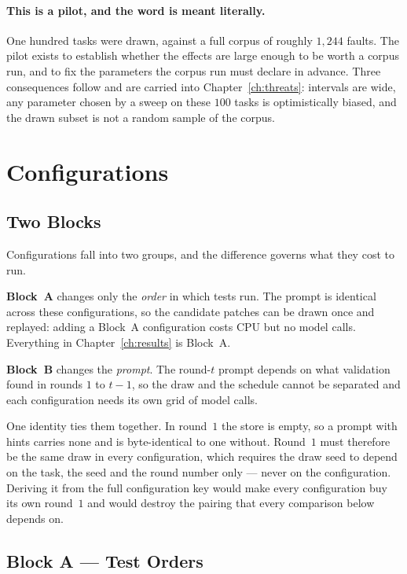 \paragraph{This is a pilot, and the word is meant literally.} One hundred tasks
were drawn, against a full corpus of roughly $1{,}244$ faults. The pilot exists
to establish whether the effects are large enough to be worth a corpus run, and
to fix the parameters the corpus run must declare in advance. Three
consequences follow and are carried into Chapter~\ref{ch:threats}: intervals
are wide, any parameter chosen by a sweep on these $100$ tasks is
optimistically biased, and the drawn subset is not a random sample of the
corpus.

\section{Configurations}
\label{sec:exp-config}

\subsection{Two Blocks}

Configurations fall into two groups, and the difference governs what they cost
to run.

\textbf{Block~A} changes only the \emph{order} in which tests run. The prompt
is identical across these configurations, so the candidate patches can be drawn
once and replayed: adding a Block~A configuration costs CPU but no model calls.
Everything in Chapter~\ref{ch:results} is Block~A.

\textbf{Block~B} changes the \emph{prompt}. The round-$t$ prompt depends on
what validation found in rounds $1$ to $t-1$, so the draw and the schedule
cannot be separated and each configuration needs its own grid of model calls.

One identity ties them together. In round~$1$ the store is empty, so a prompt
with hints carries none and is byte-identical to one without. Round~$1$ must
therefore be the same draw in every configuration, which requires the draw seed
to depend on the task, the seed and the round number only --- never on the
configuration. Deriving it from the full configuration key would make every
configuration buy its own round~$1$ and would destroy the pairing that every
comparison below depends on.

\subsection{Block A --- Test Orders}

